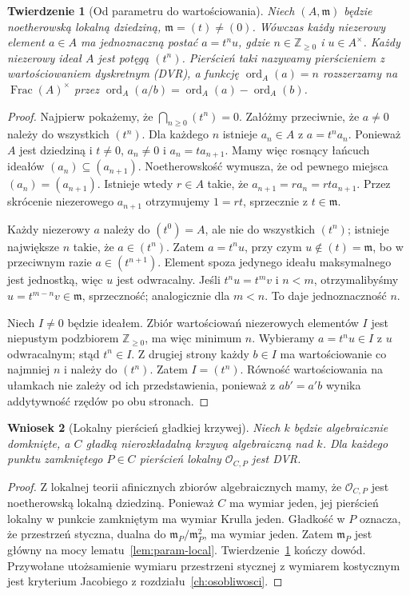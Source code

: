 \documentclass[11pt,a4paper,openany]{report}
\numberwithin{equation}{section}
\theoremstyle{plain}
\newtheorem{twierdzenie}{Twierdzenie}[section]
\newtheorem{wniosek}[twierdzenie]{Wniosek}
\theoremstyle{definition}
\theoremstyle{remark}
\newcommand{\Z}{\mathbb Z}
\newcommand{\Frac}{\operatorname{Frac}}
\begin{document}
\begin{twierdzenie}[Od parametru do wartościowania]
\label{tw:dvr}
Niech $(A,\mathfrak m)$ będzie noetherowską lokalną
dziedziną, $\mathfrak m=(t)\ne(0)$.
Wówczas każdy niezerowy element $a\in A$ ma
jednoznaczną postać $a=t^n u$, gdzie $n\in\Z_{\ge0}$
i $u\in A^\times$. Każdy niezerowy ideał $A$
jest potęgą $(t^n)$. Pierścień taki nazywamy
\emph{pierścieniem z wartościowaniem dyskretnym}
(DVR), a funkcję $\operatorname{ord}_A(a)=n$
rozszerzamy na $\Frac(A)^\times$ przez
$\operatorname{ord}_A(a/b)=\operatorname{ord}_A(a)-
\operatorname{ord}_A(b)$.
\end{twierdzenie}
\begin{proof}
Najpierw pokażemy, że $\bigcap_{n\ge0}(t^n)=0$.
Załóżmy przeciwnie, że $a\ne0$ należy do wszystkich
$(t^n)$. Dla każdego $n$ istnieje $a_n\in A$ z
$a=t^na_n$. Ponieważ $A$ jest dziedziną i $t\ne0$,
$a_n\ne0$ i $a_n=t a_{n+1}$. Mamy więc rosnący
łańcuch ideałów $(a_n)\subseteq(a_{n+1})$.
Noetherowskość wymusza, że od pewnego miejsca
$(a_n)=(a_{n+1})$. Istnieje wtedy $r\in A$
takie, że $a_{n+1}=r a_n=r t a_{n+1}$.
Przez skrócenie niezerowego $a_{n+1}$ otrzymujemy
$1=rt$, sprzecznie z $t\in\mathfrak m$.

Każdy niezerowy $a$ należy do $(t^0)=A$, ale nie
do wszystkich $(t^n)$; istnieje największe $n$
takie, że $a\in(t^n)$. Zatem $a=t^n u$,
przy czym $u\notin(t)=\mathfrak m$, bo w przeciwnym
razie $a\in(t^{n+1})$. Element spoza jedynego
ideału maksymalnego jest jednostką, więc $u$ jest
odwracalny. Jeśli $t^nu=t^mv$ i $n<m$, otrzymalibyśmy
$u=t^{m-n}v\in\mathfrak m$, sprzeczność;
analogicznie dla $m<n$. To daje jednoznaczność $n$.

Niech $I\ne0$ będzie ideałem. Zbiór wartościowań
niezerowych elementów $I$ jest niepustym podzbiorem
$\Z_{\ge0}$, ma więc minimum $n$. Wybieramy
$a=t^nu\in I$ z $u$ odwracalnym; stąd $t^n\in I$.
Z drugiej strony każdy $b\in I$ ma wartościowanie
co najmniej $n$ i należy do $(t^n)$. Zatem
$I=(t^n)$. Równość wartościowania na ułamkach
nie zależy od ich przedstawienia, ponieważ z
$ab'=a'b$ wynika addytywność rzędów po obu stronach.
\end{proof}

\begin{wniosek}[Lokalny pierścień gładkiej krzywej]
\label{wn:krzywa-dvr}
Niech $k$ będzie algebraicznie domknięte, a $C$
gładką nierozkładalną krzywą algebraiczną nad $k$.
Dla każdego punktu zamkniętego $P\in C$ pierścień
lokalny $\mathcal O_{C,P}$ jest DVR.
\end{wniosek}
\begin{proof}
Z lokalnej teorii afinicznych zbiorów algebraicznych
mamy, że $\mathcal O_{C,P}$ jest noetherowską
lokalną dziedziną. Ponieważ $C$ ma wymiar jeden,
jej pierścień lokalny w punkcie zamkniętym ma
wymiar Krulla jeden. Gładkość w $P$ oznacza,
że przestrzeń styczna, dualna do
$\mathfrak m_P/\mathfrak m_P^2$, ma wymiar jeden.
Zatem $\mathfrak m_P$ jest główny na mocy
lematu~\ref{lem:param-local}. Twierdzenie~\ref{tw:dvr}
kończy dowód. Przywołane utożsamienie wymiaru
przestrzeni stycznej z wymiarem kostycznym
jest kryterium Jacobiego z rozdziału~\ref{ch:osobliwosci}.
\end{proof}
\end{document}
